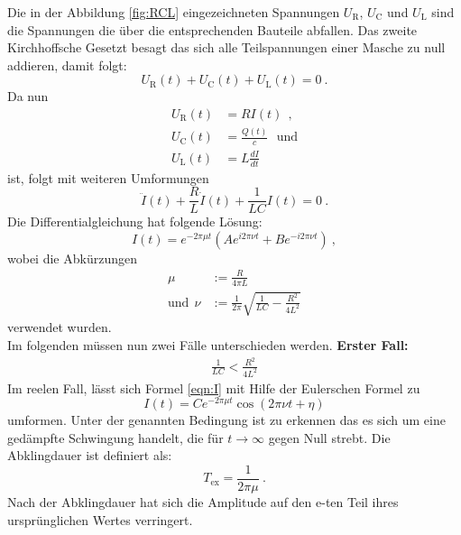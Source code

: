 Die in der Abbildung \ref{fig:RCL} eingezeichneten Spannungen $U_\text{R}$, $U_\text{C}$ und $U_\text{L}$ sind die Spannungen die über die entsprechenden Bauteile abfallen. Das zweite Kirchhoffsche Gesetzt besagt das sich alle Teilspannungen einer Masche zu null addieren, damit folgt:
\begin{equation}
	U_\text{R}(t) + U_\text{C}(t) + U_\text{L}(t) = 0 \ .
\end{equation}
Da nun
\begin{align*}
	U_\text{R}(t) &= R I(t) \ \ , \\
	U_\text{C}(t) &= \frac{Q(t)}{c} \ \ \ \text{und} \\
	U_\text{L}(t) &= L \frac{d I}{d t}
\end{align*}
ist, folgt mit weiteren Umformungen
\begin{equation}
	\ddot{I}(t) + \frac{R}{L} \dot{I}(t) + \frac{1}{LC} I(t) = 0 \ .
\end{equation}
Die Differentialgleichung hat folgende Lösung:
\begin{equation}
	I(t) = e^{-2 \pi \mu t} \left(A e^{i2 \pi \nu t} + B e^{-i2 \pi \nu t} \right) \ ,
	\label{eqn:I}
\end{equation}
wobei die Abkürzungen
\begin{align}
	\mu & := \frac{R}{4 \pi L} \\
	\label{eqn:mu}
	\text{und} \ \ \nu & := \frac{1}{2 \pi} \sqrt{\frac{1}{LC} - \frac{R^2}{4L^2}}
\end{align}
verwendet wurden. \\
Im folgenden müssen nun zwei Fälle unterschieden werden.
\newline
\newline
\textbf{Erster Fall:}
\begin{align*}
	\frac{1}{LC} < \frac{R^2}{4L^2}
\end{align*}
Im reelen Fall, lässt sich Formel \ref{eqn:I} mit Hilfe der Eulerschen Formel zu
\begin{equation}
	I(t) = C e^{-2 \pi \mu t} \cos(2 \pi \nu t + \eta)
\end{equation}
umformen. Unter der genannten Bedingung ist zu erkennen das es sich um eine gedämpfte Schwingung handelt, die für $t \to \infty$ gegen Null strebt. Die Abklingdauer ist definiert als:
\begin{equation}
	T_\text{ex} = \frac{1}{2 \pi \mu} \ .
	\label{eqn:tex}
\end{equation}
Nach der Abklingdauer hat sich die Amplitude auf den e-ten Teil ihres ursprünglichen Wertes verringert.
